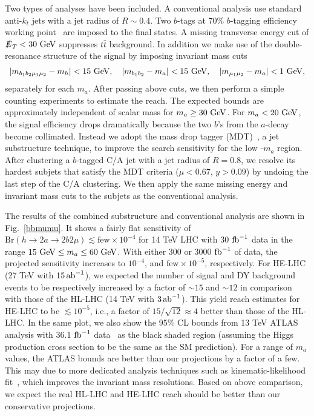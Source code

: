 Two types of analyses have been included. A conventional analysis use standard anti-$k_t$ jets with a jet radius of $R\sim 0.4$. Two $b$-tags at 70\% $b$-tagging efficiency working point~\cite{ATLAS:2014cal}  are imposed to the final states. A missing transverse energy cut of $\slashed{E}_T < 30 ~\text{GeV}$ suppresses $t \bar t$ background. In addition we make use of the double-resonance structure of the signal by imposing invariant mass cuts 
\begin{align}
|m_{b_1 b_2 \mu_1 \mu_2}-m_h|< 15~\text{GeV},\quad |m_{b_1 b_2}-m_a|< 15~\text{GeV},\quad|m_{\mu_1\mu_2}-m_a| < 1~\text{GeV},
\end{align}
separately for each $m_a$. After passing above cuts, we then perform a simple counting experiments to estimate the reach. The expected bounds are approximately independent of scalar mass for $m_a \geq 30 ~\text{GeV}$. For $m_a < 20 ~\text{GeV}$, the signal efficiency drops dramatically because the two $b$'s from the $a$-decay become collimated. Instead we adopt the mass drop tagger (MDT)~\cite{Butterworth:2008sd}, a jet substructure technique, to improve the search sensitivity for the low -$m_a$ region. After clustering a $b$-tagged C/A  jet with a jet radius of $R=0.8$, we resolve its hardest subjets that satisfy the MDT criteria ($\mu < 0.67$, $y>0.09$) by undoing the last step of the C/A clustering. We then apply the same missing energy and invariant mass cuts to the subjets as the conventional analysis.

The results of the combined substructure and conventional analysis are shown in Fig.~\ref{bbmumu}. It shows a fairly flat sensitivity of  $\mathrm{Br}(h \to 2a \to 2b2\mu) \lesssim \text{few}\times10^{-4}$ for 14 TeV LHC with 30 ${\rm fb}^{-1}$ data in the range $15~\text{GeV} \leq m_a \leq 60 ~\text{GeV}$. With either 300 or 3000 ${\rm fb}^{-1}$ of data, the projected sensitivity increases to  $10^{-4}$, and $\text{few}\times 10^{-5}$, respectively. For HE-LHC (27 TeV with $15\,{\rm ab}^{-1}$), we expected the number of signal and DY background events to be respectively increased by a factor of $\sim15$ and $\sim12$ in comparison with those of the HL-LHC (14 TeV with $3\,{\rm ab}^{-1}$). This yield reach estimates for HE-LHC to be 
$\lesssim 10^{-5}$, i.e., a factor of $15/\sqrt{12}\approx 4$ better than those of the HL-LHC. In the same plot, we also show the 95\% CL bounds from 13 TeV ATLAS analysis with 36.1 ${\rm fb}^{-1}$ data~\cite{Aaboud:2018esj} as the black shaded region (assuming the Higgs production cross section to be the same as the SM prediction). For a range of $m_a$ values, the ATLAS bounds are better than our projections  by a factor of a few. This may due to more dedicated analysis techniques such as kinematic-likelihood fit~\cite{Aaboud:2018esj}, which improves the invariant mass resolutions. Based on above comparison, we expect the real HL-LHC and HE-LHC reach should be better than our conservative projections. 



